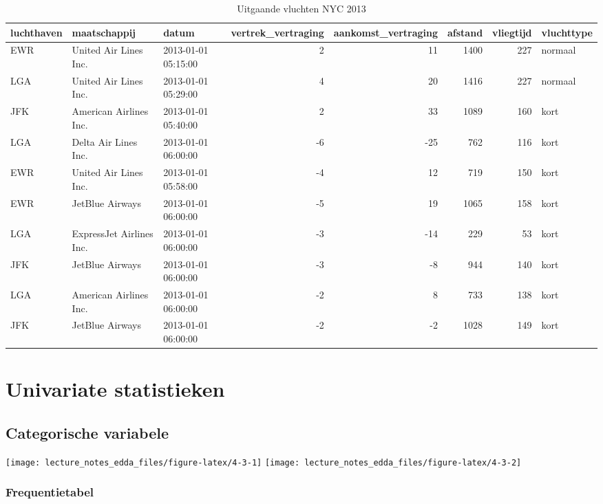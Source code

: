 \documentclass[]{memoir}
\begin{document}
\begin{table}[t]

\caption{\label{tab:4-2b}Uitgaande vluchten NYC 2013}
\centering
\fontsize{10}{12}\selectfont
\begin{tabular}{lllrrrrl}
\toprule
luchthaven & maatschappij & datum & vertrek\_vertraging & aankomst\_vertraging & afstand & vliegtijd & vluchttype\\
\midrule
EWR & United Air Lines Inc. & 2013-01-01 05:15:00 & 2 & 11 & 1400 & 227 & normaal\\
LGA & United Air Lines Inc. & 2013-01-01 05:29:00 & 4 & 20 & 1416 & 227 & normaal\\
JFK & American Airlines Inc. & 2013-01-01 05:40:00 & 2 & 33 & 1089 & 160 & kort\\
LGA & Delta Air Lines Inc. & 2013-01-01 06:00:00 & -6 & -25 & 762 & 116 & kort\\
EWR & United Air Lines Inc. & 2013-01-01 05:58:00 & -4 & 12 & 719 & 150 & kort\\
\addlinespace
EWR & JetBlue Airways & 2013-01-01 06:00:00 & -5 & 19 & 1065 & 158 & kort\\
LGA & ExpressJet Airlines Inc. & 2013-01-01 06:00:00 & -3 & -14 & 229 & 53 & kort\\
JFK & JetBlue Airways & 2013-01-01 06:00:00 & -3 & -8 & 944 & 140 & kort\\
LGA & American Airlines Inc. & 2013-01-01 06:00:00 & -2 & 8 & 733 & 138 & kort\\
JFK & JetBlue Airways & 2013-01-01 06:00:00 & -2 & -2 & 1028 & 149 & kort\\
\bottomrule
\end{tabular}
\end{table}

\section{Univariate statistieken}\label{univariate-statistieken}

\subsection{Categorische variabele}\label{categorische-variabele-1}

\texttt{[image: lecture\_notes\_edda\_files/figure-latex/4-3-1]}
\texttt{[image: lecture\_notes\_edda\_files/figure-latex/4-3-2]}

\subsubsection*{Frequentietabel}\label{frequentietabel}
\end{document}
